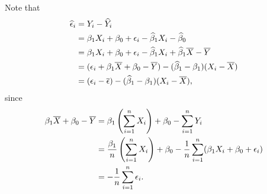 \begin{ex}
  Note that
  \begin{align*}
    \widehat{\epsilon}_i
     & =Y_i-\widehat{Y}_i                                                             \\
     & =\beta_1X_i+\beta_0+\epsilon_i
    -\widehat{\beta}_1X_i-\widehat{\beta}_0                                                   \\
     & =\beta_1X_i+\beta_0+\epsilon_i
    -\widehat{\beta}_1X_i+\widehat{\beta}_1\overline{X}-\overline{Y}                                        \\
     & =(\epsilon_i+\beta_1\overline{X}+\beta_0-\overline{Y})-(\widehat{\beta}_1-\beta_1)(X_i-\overline{X}) \\
     & =(\epsilon_i-\overline{\epsilon})-(\widehat{\beta}_1-\beta_1)(X_i-\overline{X}),
  \end{align*}
  since
  \begin{align*}
    \beta_1\overline{X}+\beta_0-\overline{Y}
     & =\beta_1\left(\sum_{i=1}^nX_i\right)+\beta_0-\sum_{i=1}^n Y_i                                                   \\
     & =\frac{\beta_1}{n}\left(\sum_{i=1}^n X_i\right)+\beta_0-\frac{1}{n}\sum_{i=1}^n (\beta_1X_i+\beta_0+\epsilon_i) \\
     & =-\frac{1}{n}\sum_{i=1}^n\epsilon_i.
  \end{align*}


\end{ex}
